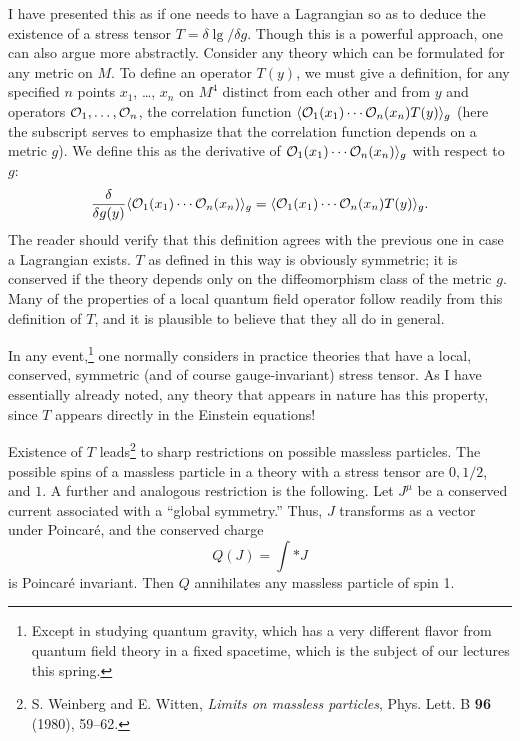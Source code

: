 I have presented this as if one needs to have a Lagrangian
so as to deduce the existence of a stress tensor $T=\delta\lg/\delta g$.
Though this is  a powerful approach, one can also argue more abstractly.
Consider any theory which can be formulated for any metric on $M$.
To define an operator $T(y)$, we must give a definition,
for any   specified $n$
points $x_1$, \dots, $x_n$ on $M^4$ distinct from each other and from $y$
and operators ${\cal O}_1,\dots, {\cal O}_n$,
the correlation function $\langle{\cal O}_1(x_1)\cdots{\cal O}_n(x_n)T(y)\rangle_g$
(here the subscript serves to emphasize that the correlation function depends 
on 
a metric $g$).
We define this as the derivative of  ${\cal O}_1(x_1)\cdots{\cal O}_n(x_n)\rangle_g$
with respect to $g$:
$$
\frac{\delta}{\delta g(y)}\langle {\cal O}_1(x_1)\cdots{\cal O}_n(x_n)\rangle_g
=\langle{\cal O}_1(x_1)\cdots{\cal O}_n(x_n)T(y)\rangle_g.
$$
The reader should verify that this definition agrees
with the previous one in case a Lagrangian exists. $T$ as defined in this
way is obviously symmetric; it is conserved if the theory depends only
on the diffeomorphism class of the metric $g$.  Many of the properties
of a local quantum field operator follow readily from this definition
of $T$, and it is plausible to believe that they all do in general.


In any event,\footnote{Except in studying quantum gravity, which
has a very different flavor from quantum field theory in 
a fixed spacetime, which is the subject of our lectures this spring.} 
one normally considers in practice theories that have a local,
conserved, symmetric (and of course gauge-invariant)
stress tensor.  As I have essentially already
noted, any theory that appears in nature has this property, since $T$
appears directly in the Einstein equations!

Existence of $T$ leads\footnote{S. Weinberg and E. Witten,
{\it Limits on massless particles}, Phys. Lett. B {\bf 96} (1980), 59--62.}
to sharp restrictions on possible massless particles.
The possible spins of a massless particle in a theory with a stress tensor
are $0,1/2$, and $1$.
A further and analogous restriction is the following.  Let $J^\mu$ be
a conserved current associated with a ``global symmetry.''  Thus,
$J$ transforms as a vector under Poincar\'e, and the conserved charge
$$Q(J)=\int *J$$
is Poincar\'e invariant.  Then $Q$ annihilates any massless particle of spin
1.   

